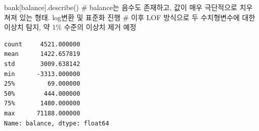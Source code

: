 \documentclass[
  a4paper,
  DIV=11,
  numbers=noendperiod]{scrreprt}
\newenvironment{Shaded}{\begin{snugshade}}{\end{snugshade}}
\newcommand{\CommentTok}[1]{\textcolor[rgb]{0.37,0.37,0.37}{#1}}
\newcommand{\NormalTok}[1]{\textcolor[rgb]{0.00,0.23,0.31}{#1}}
\newcommand{\StringTok}[1]{\textcolor[rgb]{0.13,0.47,0.30}{#1}}
\begin{document}
\begin{Shaded}
\begin{Highlighting}[]
\NormalTok{bank[}\StringTok{\textquotesingle{}balance\textquotesingle{}}\NormalTok{].describe()}
\CommentTok{\# balance는 음수도 존재하고, 값이 매우 극단적으로 치우쳐져 있는 형태. log변환 및 표준화 진행}
\CommentTok{\# 이후 LOF 방식으로 두 수치형변수에 대한 이상치 탐지, 약 1\% 수준의 이상치 제거 예정}
\end{Highlighting}
\end{Shaded}

\begin{verbatim}
count     4521.000000
mean      1422.657819
std       3009.638142
min      -3313.000000
25%         69.000000
50%        444.000000
75%       1480.000000
max      71188.000000
Name: balance, dtype: float64
\end{verbatim}
\end{document}
